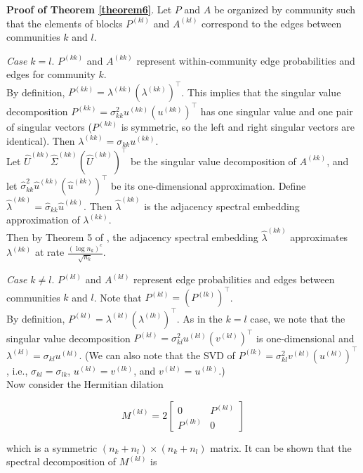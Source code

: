 \documentclass[12pt]{article}
\begin{document}
\textbf{Proof of Theorem \ref{theorem6}}. Let \(P\) and \(A\) be
organized by community such that the elements of blocks \(P^{(kl)}\) and
\(A^{(kl)}\) correspond to the edges between communities \(k\) and
\(l\).

\emph{Case \(k = l\)}. \(P^{(kk)}\) and \(A^{(kk)}\) represent
within-community edge probabilities and edges for community \(k\).\\
By definition, \(P^{(kk)} = \lambda^{(kk)} (\lambda^{(kk)})^\top\). This
implies that the singular value decomposition
\(P^{(kk)} = \sigma_{kk}^2 u^{(kk)} (u^{(kk)})^\top\) has one singular
value and one pair of singular vectors (\(P^{(kk)}\) is symmetric, so
the left and right singular vectors are identical). Then
\(\lambda^{(kk)} = \sigma_{kk} u^{(kk)}\).\\
Let \(\hat{U}^{(kk)} \hat{\Sigma}^{(kk)} (\hat{U}^{(kk)})^\top\) be the
singular value decomposition of \(A^{(kk)}\), and let
\(\hat{\sigma}_{kk}^2 \hat{u}^{(kk)} (\hat{u}^{(kk)})^\top\) be its
one-dimensional approximation. Define
\(\hat{\lambda}^{(kk)} = \hat{\sigma}_{kk} \hat{u}^{(kk)}\). Then
\(\hat{\lambda}^{(kk)}\) is the adjacency spectral embedding
approximation of \(\lambda^{(kk)}\).\\
Then by Theorem 5 of \citeauthor{rubindelanchy2017statistical}, the
adjacency spectral embedding \(\hat{\lambda}^{(kk)}\) approximates
\(\lambda^{(kk)}\) at rate \(\frac{(\log n_k)^c}{\sqrt{n_k}}\).

\emph{Case \(k \neq l\)}. \(P^{(kl)}\) and \(A^{(kl)}\) represent edge
probabilities and edges between communities \(k\) and \(l\). Note that
\(P^{(kl)} = (P^{(lk)})^\top\).\\
By definition, \(P^{(kl)} = \lambda^{(kl)} (\lambda^{(lk)})^\top\). As
in the \(k = l\) case, we note that the singular value decomposition
\(P^{(kl)} = \sigma_{kl}^2 u^{(kl)} (v^{(kl)})^\top\) is one-dimensional
and \(\lambda^{(kl)} = \sigma_{kl} u^{(kl)}\). (We can also note that
the SVD of \(P^{(lk)} = \sigma_{kl}^2 v^{(kl)} (u^{(kl)})^\top\), i.e.,
\(\sigma_{kl} = \sigma_{lk}\), \(u^{(kl)} = v^{(lk)}\), and
\(v^{(kl)} = u^{(lk)}\).)\\
Now consider the Hermitian dilation

\[M^{(kl)} = 2 \begin{bmatrix} 0 & P^{(kl)} \\ P^{(lk)} & 0 \end{bmatrix}\]

which is a symmetric \((n_k + n_l) \times (n_k + n_l)\) matrix. It can
be shown that the spectral decomposition of \(M^{(kl)}\) is
\end{document}
